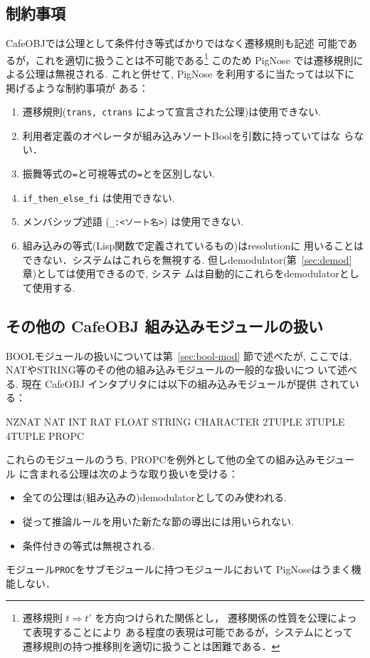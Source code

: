 \subsection{制約事項}
CafeOBJでは公理として条件付き等式ばかりではなく遷移規則も記述
可能であるが，これを適切に扱うことは不可能である\footnote{%
  遷移規則 $t \Rightarrow t'$ を方向つけられた関係とし，
  遷移関係の性質を公理によって表現することにより
  ある程度の表現は可能であるが，システムにとって
  遷移規則の持つ推移則を適切に扱うことは困難である．
}
このため PigNose では遷移規則による公理は無視される.
これと併せて, PigNose を利用するに当たっては以下に掲げるような制約事項が
ある：
\begin{snugshade}
\begin{enumerate}
\item 遷移規則(\texttt{trans, ctrans} によって宣言された公理)は使用できない.
\item 利用者定義のオペレータが組み込みソートBoolを引数に持っていてはな
    らない．
\item 振舞等式の\texttt{=}と可視等式の\texttt{=}とを区別しない.
\item \texttt{if\_then\_else\_fi} は使用できない.
\item メンバシップ述語 (\texttt{\_:<ソート名>}) は使用できない.
\item 組み込みの等式(Lisp関数で定義されているもの)はresolutionに
  用いることはできない．システムはこれらを無視する. 
  但しdemodulator(第~\ref{sec:demod}章)としては使用できるので, システ
  ムは自動的にこれらをdemodulatorとして使用する. 
\end{enumerate}
\end{snugshade}

\subsection{その他の CafeOBJ 組み込みモジュールの扱い}
BOOLモジュールの扱いについては第~\ref{sec:bool-mod} 節で述べたが,
ここでは, NATやSTRING等のその他の組み込みモジュールの一般的な扱いにつ
いて述べる. 現在 CafeOBJ インタプリタには以下の組み込みモジュールが提供
されている：
\begin{center}
\begin{simplev}
  NZNAT       NAT      INT      RAT      FLOAT    STRING 
  CHARACTER   2TUPLE   3TUPLE   4TUPLE   PROPC
\end{simplev}
\end{center}
これらのモジュールのうち, PROPCを例外として他の全ての組み込みモジュール
に含まれる公理は次のような取り扱いを受ける：
\begin{itemize}
\item 全ての公理は(組み込みの)demodulatorとしてのみ使われる.
\item 従って推論ルールを用いた新たな節の導出には用いられない.
\item 条件付きの等式は無視される.
\end{itemize}
モジュール\texttt{PROC}をサブモジュールに持つモジュールにおいて
PigNoseはうまく機能しない．

